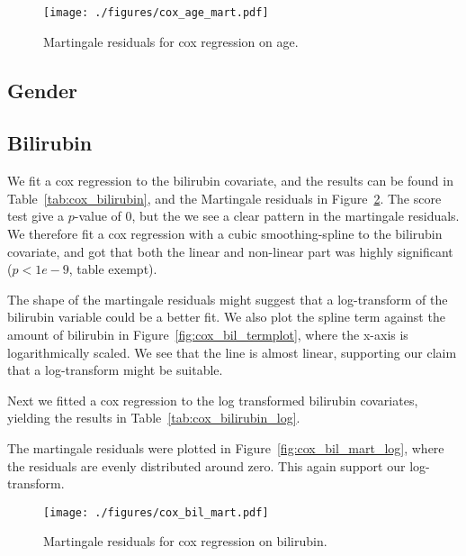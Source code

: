 \documentclass[11pt,a4paper]{article}
\begin{document}
\begin{figure}[h!tb]
    \begin{center}
        \texttt{[image: ./figures/cox\_age\_mart.pdf]}
    \end{center}
    \vspace{-0.2cm}
    \caption{Martingale residuals for cox regression on age.}
    \label{fig:cox_age_mart}
\end{figure}

\subsection{Gender}



\subsection{Bilirubin}

We fit a cox regression to the bilirubin covariate, and the results can be found in Table~\ref{tab:cox_bilirubin}, and the Martingale residuals in Figure~\ref{fig:cox_bil_mart}. The score test give a $p$-value of 0, but the we see a clear pattern in the martingale residuals. We therefore fit a cox regression with a cubic smoothing-spline to the bilirubin covariate, and got that both the linear and non-linear part was highly significant ($p < 1e-9$, table exempt).

The shape of the martingale residuals might suggest that a log-transform of the bilirubin variable could be a better fit. We also plot the spline term against the amount of bilirubin in Figure~\ref{fig:cox_bil_termplot}, where the x-axis is logarithmically scaled. We see that the line is almost linear, supporting our claim that a log-transform might be suitable.

Next we fitted a cox regression to the log transformed bilirubin covariates, yielding the results in Table~\ref{tab:cox_bilirubin_log}.

The martingale residuals were plotted in Figure~\ref{fig:cox_bil_mart_log}, where the residuals are evenly distributed around zero. This again support our log-transform.



\begin{figure}[h!tb]
    \begin{center}
        \texttt{[image: ./figures/cox\_bil\_mart.pdf]}
    \end{center}
    \vspace{-0.2cm}
    \caption{Martingale residuals for cox regression on bilirubin.}
    \label{fig:cox_bil_mart}
\end{figure}
\end{document}
